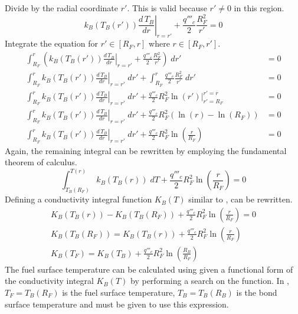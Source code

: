       Divide  by the radial coordinate $r'$. This is
      valid because $r' \ne 0$ in this region.
      \begin{equation}
        \left. k_B(T_B(r')) \frac{d\,T_B}{dr} \right|_{r=r'} + 
          \frac{q'''_c}{2} \frac{R_F^2}{r'} = 0
      \end{equation}
      Integrate the equation for $r' \in [R_F,r]$ where $r \in [R_F,r']$.
      \begin{align}
        \int_{R_F}^r \left( \left. k_B(T_B(r')) \frac{d\,T_B}{dr}\right|_{r=r'}
          + \frac{q'''_c}{2} \frac{R_F^2}{r'} \right) \; dr' &= 0 \\
        \int_{R_F}^r \left. k_B(T_B(r')) \frac{d\,T_B}{dr}\right|_{r=r'} \; dr'
          + \int_{R_F}^r \frac{q'''_c}{2} \frac{R_F^2}{r'} \; dr' &= 0\\
        \int_{R_F}^r \left. k_B(T_B(r')) \frac{d\,T_B}{dr}\right|_{r=r'} \; dr'
          + \frac{q'''_c}{2} R_F^2 \left. \ln(r') \right|_{r'=R_F}^{r'=r} &= 0\\
        \int_{R_F}^r \left. k_B(T_B(r')) \frac{d\,T_B}{dr}\right|_{r=r'} \; dr'
          + \frac{q'''_c}{2} R_F^2 ( \ln(r) - \ln(R_F)) &= 0 \\
        \int_{R_F}^r \left. k_B(T_B(r')) \frac{d\,T_B}{dr}\right|_{r=r'} \; dr'
          + \frac{q'''_c}{2} R_F^2 \ln\left(\frac{r}{R_F}\right) &= 0 
      \end{align}
      Again, the remaining integral can be rewritten by employing the
      fundamental theorem of calculus.
      \begin{equation}
        \label{eq:tf_fundamental_theorem}
        \int_{T_B(R_F)}^{T(r)} k_B(T_B(r)) \; dT + \frac{q'''_c}{2} R_F^2 
          \ln\left(\frac{r}{R_F}\right) = 0
      \end{equation}
      Defining a conductivity integral function $K_B(T)$ similar to
      ,  can be
      rewritten.
      \begin{gather}
        K_B(T_B(r)) - K_B(T_B(R_F)) + \frac{q'''_c}{2} R_F^2
          \ln\left(\frac{r}{R_F}\right) = 0 \\
        \label{eq:tbond_r}
        K_B(T_B(R_F)) = K_B(T_B(r)) + \frac{q'''_c}{2} R_F^2
          \ln\left(\frac{r}{R_F}\right) \\
        \label{eq:tf_conductivity_integral}
        K_B(T_F) = K_B(T_B) + \frac{q'''_c}{2} R_F^2
          \ln\left(\frac{R_B}{R_F}\right)
      \end{gather}
      The fuel surface temperature can be calculated using
       given a functional form of the
      conductivity integral $K_B(T)$ by performing a search on the function. In
      , $T_F=T_B(R_F)$ is the fuel surface 
      temperature, $T_B=T_B(R_B)$ is the bond surface temperature and must be
      given to use this expression.

